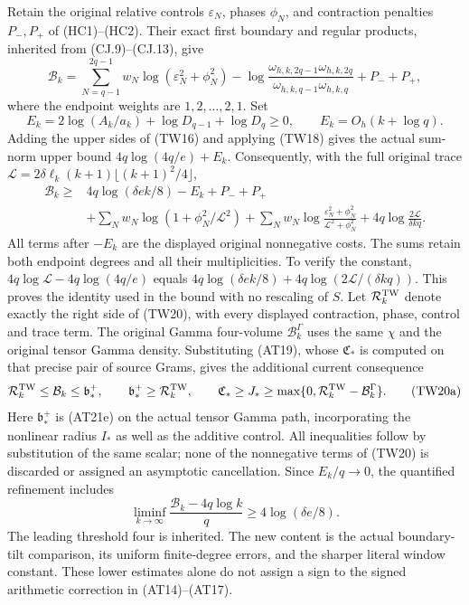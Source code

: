 \documentclass[11pt,a4paper]{article}
\begin{document}
Retain the original relative controls $\varepsilon_N$, phases $\phi_N$,
and contraction penalties $P_-,P_+$ of (HC1)--(HC2).  Their exact first
boundary and regular products, inherited from (CJ.9)--(CJ.13), give
\[
 \mathcal B_k=\sum_{N=q-1}^{2q-1}w_N
 \log(\varepsilon_N^2+\phi_N^2)
 -\log\frac{\omega_{h,k,2q-1}\omega_{h,k,2q}}
                {\omega_{h,k,q-1}\omega_{h,k,q}}+P_-+P_+,
\]
where the endpoint weights are $1,2,\ldots,2,1$.  Set
\[
 E_k=2\log(A_k/a_k)+\log D_{q-1}+\log D_q\geq0,
 \qquad E_k=O_h(k+\log q).
\]
Adding the upper sides of (TW16) and applying (TW18) gives the
actual sum-norm upper bound $4q\log(4q/e)+E_k$.
Consequently, with the full original trace
$\mathcal L=2\delta\ell_k(k+1)\lfloor(k+1)^2/4\rfloor$,
\[
 \begin{split}
 \mathcal B_k\geq{}&4q\log(\delta e k/8)-E_k+P_-+P_+\\
 &+\sum_Nw_N\log(1+\phi_N^2/\mathcal L^2)
 +\sum_Nw_N\log\frac{\varepsilon_N^2+\phi_N^2}
                           {\mathcal L^2+\phi_N^2}
 +4q\log\frac{2\mathcal L}{\delta kq}.
 \end{split}\tag{TW20}
\]
All terms after $-E_k$ are the displayed original nonnegative costs.
The sums retain both endpoint degrees and all their multiplicities.
To verify the constant, $4q\log\mathcal L-4q\log(4q/e)$ equals
$4q\log(\delta e k/8)+4q\log(2\mathcal L/(\delta kq))$.
This proves the identity used in the bound with no rescaling of $S$.
Let $\mathcal R_k^{\rm TW}$ denote exactly the right side of
(TW20), with every displayed contraction, phase, control and trace term.
The original Gamma four-volume $\mathcal B_k^\Gamma$ uses the
same $\chi$ and the original tensor Gamma density. Substituting
(AT19), whose $\mathfrak C_*$ is computed on that precise pair of
source Grams, gives the additional current consequence
\[
\mathcal R_k^{\rm TW}\le\mathcal B_k
 \le\mathfrak b_*^+,\qquad
\mathfrak b_*^+\ge\mathcal R_k^{\rm TW},\qquad
\mathfrak C_*\ge J_*\ge\max\{0,\mathcal R_k^{\rm TW}-\mathcal B_k^\Gamma\}.
\tag{TW20a}
\]
Here $\mathfrak b_*^+$ is (AT21e) on the actual tensor Gamma
path, incorporating the nonlinear radius $I_*$ as well as the
additive control. All inequalities follow by substitution of the same scalar;
none of the nonnegative terms of (TW20) is discarded or assigned
an asymptotic cancellation. Since $E_k/q\to0$, the quantified refinement includes
\[
 \liminf_{k\to\infty}
 \frac{\mathcal B_k-4q\log k}{q}
 \geq4\log(\delta e/8).
 \tag{TW21}
\]
The leading threshold four is inherited.  The new content is the
actual boundary-tilt comparison, its uniform finite-degree errors,
and the sharper literal window constant.  These lower estimates
alone do not assign a sign to the signed arithmetic correction in
(AT14)--(AT17).
\end{document}
